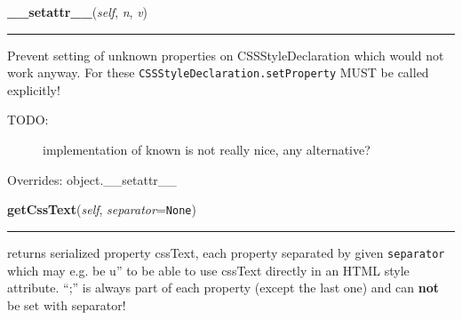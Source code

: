\hspace{.8\funcindent}\begin{boxedminipage}{\funcwidth}

    \raggedright \textbf{\_\_setattr\_\_}(\textit{self}, \textit{n}, \textit{v})

    \vspace{-1.5ex}

    \rule{\textwidth}{0.5\fboxrule}
\setlength{\parskip}{2ex}

Prevent setting of unknown properties on CSSStyleDeclaration
which would not work anyway. For these
\texttt{CSSStyleDeclaration.setProperty} MUST be called explicitly!
\begin{description}
\item[{TODO:}] \leavevmode 
implementation of known is not really nice, any alternative?

\end{description}
\setlength{\parskip}{1ex}
      Overrides: object.\_\_setattr\_\_

    \end{boxedminipage}

    \label{cssutils:css:cssstyledeclaration:CSSStyleDeclaration:getCssText}

    \vspace{0.5ex}

\hspace{.8\funcindent}\begin{boxedminipage}{\funcwidth}

    \raggedright \textbf{getCssText}(\textit{self}, \textit{separator}={\tt None})

    \vspace{-1.5ex}

    \rule{\textwidth}{0.5\fboxrule}
\setlength{\parskip}{2ex}

returns serialized property cssText, each property separated by
given \texttt{separator} which may e.g. be u'' to be able to use
cssText directly in an HTML style attribute. ``;'' is always part of
each property (except the last one) and can \textbf{not} be set with
separator!
\setlength{\parskip}{1ex}
    \end{boxedminipage}

    \label{cssutils:css:cssstyledeclaration:CSSStyleDeclaration:getProperties}

